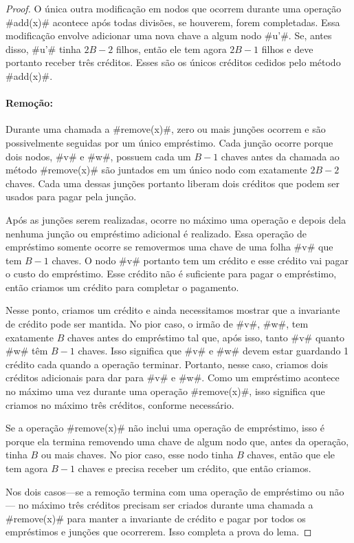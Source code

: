 \begin{proof}
  O única outra modificação em nodos que ocorrem durante uma operação
  #add(x)# acontece após todas divisões, se houverem, forem completadas.
Essa modificação envolve adicionar uma nova chave a algum nodo #u'#.
Se, antes disso, 
#u'# tinha $2B-2$ filhos, então ele tem agora $2B-1$ filhos e deve portanto
  receber três créditos. Esses são os únicos créditos cedidos pelo método #add(x)#.

  \paragraph{Remoção:}
  Durante uma chamada a #remove(x)#, zero ou mais junções ocorrem e são 
  possivelmente seguidas por um único empréstimo. Cada junção ocorre porque dois nodos, 
  #v# e #w#, possuem cada um $B-1$ chaves antes da chamada ao método
  #remove(x)# são juntados em um único nodo com exatamente $2B-2$ chaves.
Cada uma dessas junções portanto liberam dois créditos que podem ser usados para pagar pela junção.

  Após as junções serem realizadas, ocorre no máximo uma operação e 
  depois dela nenhuma junção ou empréstimo adicional é realizado.
Essa operação de empréstimo somente ocorre se removermos uma chave de uma
folha #v# que tem $B-1$ chaves.
O nodo #v# portanto tem um crédito e esse crédito vai pagar o custo do 
empréstimo. Esse crédito não é suficiente para pagar o empréstimo, então
criamos um crédito para completar o pagamento.

Nesse ponto, criamos um crédito e ainda necessitamos mostrar que a invariante
de crédito pode ser mantida. No pior caso, o irmão de #v#, #w#, tem
exatamente $B$ chaves antes do empréstimo tal que, após isso, tanto #v# quanto #w#
têm $B-1$ chaves. Isso significa que #v# e #w# devem estar guardando 1
crédito cada quando a operação terminar.
Portanto, nesse caso, criamos dois créditos adicionais para dar para #v# e #w#.
Como um empréstimo acontece no máximo uma vez durante uma operação 
#remove(x)#, isso significa que criamos no máximo três créditos, conforme necessário. 

Se a operação #remove(x)# não inclui uma operação de empréstimo, isso é porque ela termina removendo uma chave de algum nodo que, antes da operação, tinha $B$ ou mais chaves. No pior caso, esse nodo tinha $B$ chaves, então que ele tem agora $B-1$ chaves e precisa receber um crédito, que então criamos. 

Nos dois casos---se a remoção termina com uma operação de empréstimo ou não---
no máximo três créditos precisam ser criados durante uma chamada a 
  #remove(x)# para manter a invariante de crédito e pagar por todos
  os empréstimos e junções que ocorrerem. Isso completa a prova do lema. 
\end{proof}

